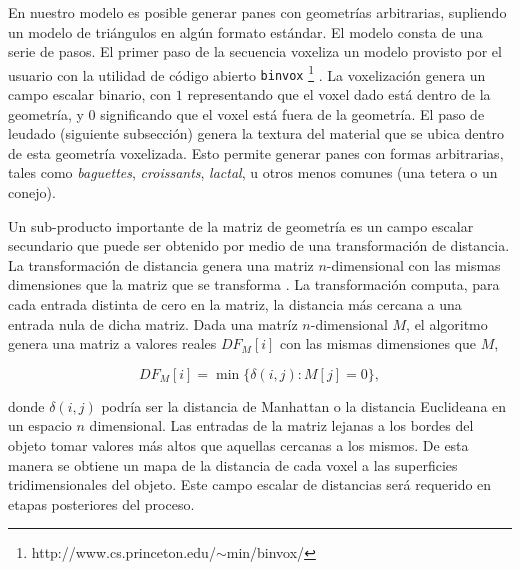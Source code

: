 En nuestro modelo es posible generar panes con geometrías arbitrarias, supliendo un modelo de triángulos en algún formato estándar.
El modelo consta de una serie de pasos. El primer paso de la secuencia voxeliza un modelo provisto por el usuario con la utilidad de código abierto {\tt binvox} \footnote{http://www.cs.princeton.edu/$\sim$min/binvox/} \cite{Nooruddin2003}.
La voxelización genera un campo escalar binario, con $1$ representando que el voxel dado está dentro de la geometría, y $0$ significando que el voxel está fuera de la geometría.
El paso de leudado (siguiente subsección) genera la textura del material que se ubica dentro de esta geometría voxelizada.
Esto permite generar panes con formas arbitrarias, tales como {\em baguettes}, {\em croissants}, {\em lactal}, u otros menos comunes (una tetera o un conejo).

Un sub-producto importante de la matriz de geometría es un campo escalar secundario que puede ser obtenido por medio de una transformación de distancia.
La transformación de distancia genera una matriz $n$-dimensional con las mismas dimensiones que la matriz que se transforma \cite{osh03}.
La transformación computa, para cada entrada distinta de cero en la matriz, la distancia más cercana a una entrada nula de dicha matriz.
Dada una matríz $n$-dimensional $M$, el algoritmo genera una matriz a valores reales $DF_{M}[i]$ con las mismas dimensiones que $M$,


$$  DF_{M}[i] = \min \bigg\{ \delta(i,j): M[j] = 0 \bigg\},$$


\noindent
donde $\delta(i,j)$ podría ser la distancia de Manhattan o la distancia Euclideana en un espacio $n$ dimensional.
Las entradas de la matriz lejanas a los bordes del objeto tomar valores más altos que aquellas cercanas a los mismos.
De esta manera se obtiene un mapa de la distancia de cada voxel a las superficies tridimensionales del objeto.
Este campo escalar de distancias será requerido en etapas posteriores del proceso.


